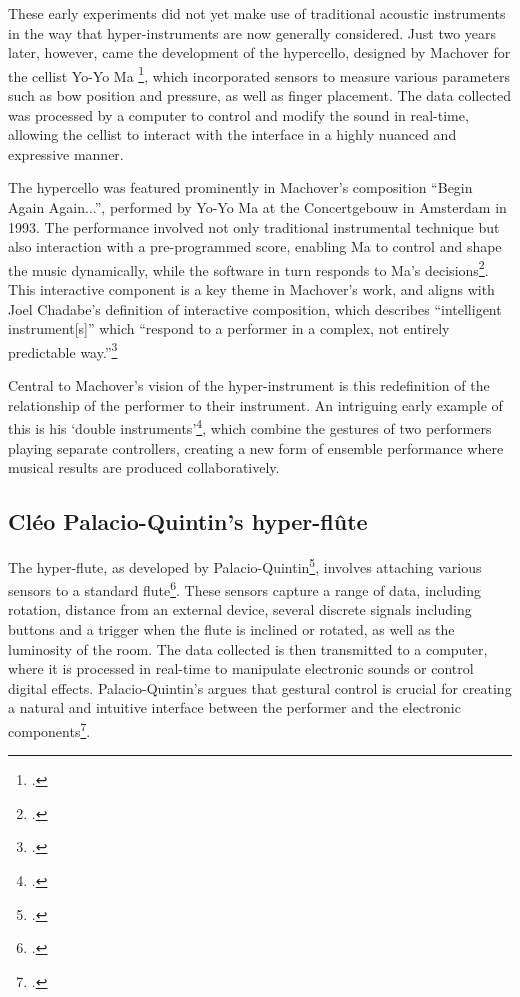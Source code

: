 \documentclass[12pt,twoside,maitrise]{dms_ks}
\theoremstyle{definition}
\begin{document}
{These early experiments did not yet make use of traditional acoustic instruments in the way that hyper-instruments are now generally considered. 
Just two years later, however, came the development of the hypercello, designed by Machover for the cellist Yo-Yo Ma \footcite[15]{levenson_taming_1994}, which incorporated sensors to measure various parameters such as bow position and pressure, as well as finger placement.
The data collected was processed by a computer to control and modify the sound in real-time, allowing the cellist to interact with the interface in a highly nuanced and expressive manner.

The hypercello was featured prominently in Machover's composition “Begin Again Again...”, performed by Yo-Yo Ma at the Concertgebouw in Amsterdam in 1993. 
The performance involved not only traditional instrumental technique but also interaction with a pre-programmed score, enabling Ma to control and shape the music dynamically, while the software in turn responds to Ma's decisions\footcite[16]{levenson_taming_1994}. 
This interactive component is a key theme in Machover's work, and aligns with Joel Chadabe's definition of interactive composition, which describes “intelligent instrument[s]” which “respond to a performer in a complex, not entirely predictable way.”\footcite[23]{chadabe_interactive_1984}

Central to Machover's vision of the hyper-instrument is this redefinition of the relationship of the performer to their instrument. 
An intriguing early example of this is his `double instruments'\footcite[189]{machover_hyper-instruments_1989}, which combine the gestures of two performers playing separate controllers, creating a new form of ensemble performance where musical results are produced collaboratively.

\subsection{Cléo Palacio-Quintin's hyper-flûte}

The hyper-flute, as developed by Palacio-Quintin\footcite{noauthor_souffles_2017}, involves attaching various sensors to a standard flute\footcite[27]{palacio-quintin_composition_2012-1}. 
These sensors capture a range of data, including rotation, distance from an external device, several discrete signals including buttons and a trigger when the flute is inclined or rotated, as well as the luminosity of the room. 
The data collected is then transmitted to a computer, where it is processed in real-time to manipulate electronic sounds or control digital effects. 
Palacio-Quintin's argues that gestural control is crucial for creating a natural and intuitive interface between the performer and the electronic components\footcite[12]{palacio-quintin_composition_2012-1}. 

}
\end{document}
